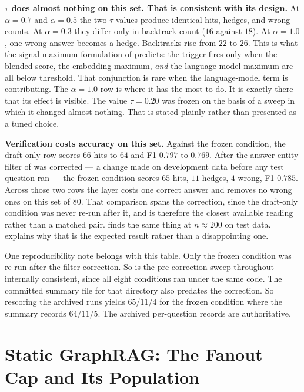 \textbf{$\tau$ does almost nothing on this set. That is consistent with its
design.} At $\alpha = 0.7$ and $\alpha = 0.5$ the two $\tau$ values produce
identical hits, hedges, and wrong counts. At $\alpha = 0.3$ they differ only in
backtrack count ($16$ against $18$). At $\alpha = 1.0$, one wrong answer becomes
a hedge. Backtracks rise from $22$ to $26$. This is what the signal-maximum
formulation of  predicts: the trigger fires only when the
blended score, the embedding maximum, \emph{and} the language-model maximum are
all below threshold. That conjunction is rare when the language-model term is
contributing. The $\alpha = 1.0$ row is where it has the most to do. It is
exactly there that its effect is visible. The value $\tau = 0.20$ was frozen on
the basis of a sweep in which it changed almost nothing. That is stated plainly
rather than presented as a tuned choice.

\textbf{Verification costs accuracy on this set.} Against the frozen condition,
the draft-only row scores $66$ hits to $64$ and F1 $0.797$ to $0.769$. After the
answer-entity filter of  was corrected --- a change
made on development data before any test question ran --- the frozen condition
scores $65$ hits, $11$ hedges, $4$ wrong, F1 $0.785$. Across those two rows the
layer costs one correct answer and removes no wrong ones on this set of $80$.
That comparison spans the correction, since the draft-only condition was never
re-run after it, and is therefore the closest available reading rather than a
matched pair.  finds the same thing at $n \approx 200$ on
test data.  explains why that is the expected result
rather than a disappointing one.

One reproducibility note belongs with this table. Only the frozen condition was
re-run after the filter correction. So  is the pre-correction
sweep throughout --- internally consistent, since all eight conditions ran under
the same code. The committed summary file for that directory also predates the
correction. So rescoring the archived runs yields $65/11/4$ for the frozen
condition where the summary records $64/11/5$. The archived per-question records
are authoritative.


\section{Static GraphRAG: The Fanout Cap and Its Population}\label{app:fanout}

